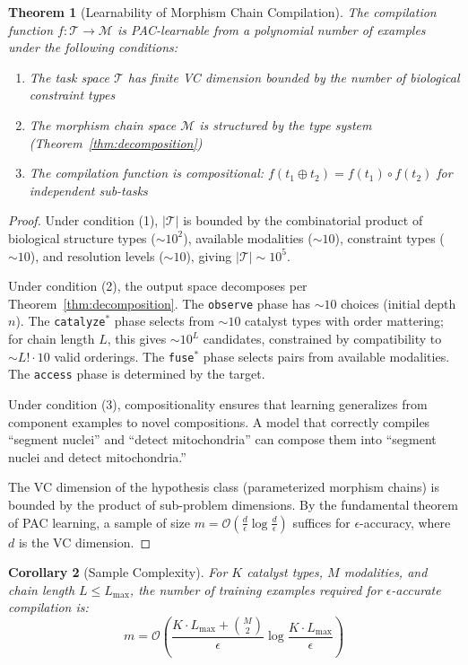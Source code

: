 \documentclass[11pt,twocolumn,a4paper]{article}
\newtheorem{theorem}{Theorem}[section]
\newtheorem{corollary}[theorem]{Corollary}
\theoremstyle{definition}
\theoremstyle{remark}
\begin{document}
\begin{theorem}[Learnability of Morphism Chain Compilation]
\label{thm:learnability}
The compilation function $f: \mathcal{T} \to \mathcal{M}$ is PAC-learnable from a polynomial number of examples under the following conditions:
\begin{enumerate}
    \item The task space $\mathcal{T}$ has finite VC dimension bounded by the number of biological constraint types
    \item The morphism chain space $\mathcal{M}$ is structured by the type system (Theorem~\ref{thm:decomposition})
    \item The compilation function is compositional: $f(t_1 \oplus t_2) = f(t_1) \circ f(t_2)$ for independent sub-tasks
\end{enumerate}
\end{theorem}

\begin{proof}
Under condition (1), $|\mathcal{T}|$ is bounded by the combinatorial product of biological structure types ($\sim 10^2$), available modalities ($\sim 10$), constraint types ($\sim 10$), and resolution levels ($\sim 10$), giving $|\mathcal{T}| \sim 10^5$.

Under condition (2), the output space decomposes per Theorem~\ref{thm:decomposition}. The \texttt{observe} phase has $\sim 10$ choices (initial depth $n$). The \texttt{catalyze}$^*$ phase selects from $\sim 10$ catalyst types with order mattering; for chain length $L$, this gives $\sim 10^L$ candidates, constrained by compatibility to $\sim L! \cdot 10$ valid orderings. The \texttt{fuse}$^*$ phase selects pairs from available modalities. The \texttt{access} phase is determined by the target.

Under condition (3), compositionality ensures that learning generalizes from component examples to novel compositions. A model that correctly compiles ``segment nuclei'' and ``detect mitochondria'' can compose them into ``segment nuclei and detect mitochondria.''

The VC dimension of the hypothesis class (parameterized morphism chains) is bounded by the product of sub-problem dimensions. By the fundamental theorem of PAC learning, a sample of size $m = \mathcal{O}(\frac{d}{\epsilon} \log \frac{d}{\epsilon})$ suffices for $\epsilon$-accuracy, where $d$ is the VC dimension.
\end{proof}

\begin{corollary}[Sample Complexity]
For $K$ catalyst types, $M$ modalities, and chain length $L \leq L_{\max}$, the number of training examples required for $\epsilon$-accurate compilation is:
\begin{equation}
m = \mathcal{O}\left(\frac{K \cdot L_{\max} + \binom{M}{2}}{\epsilon} \log \frac{K \cdot L_{\max}}{\epsilon}\right)
\end{equation}
\end{corollary}
\end{document}
